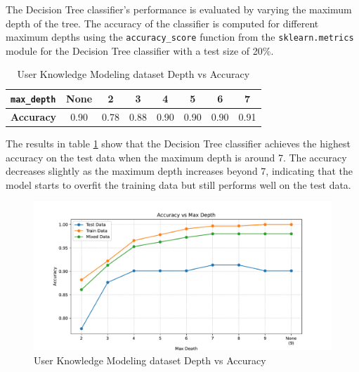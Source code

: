 The Decision Tree classifier's performance is evaluated by varying the maximum depth of the tree. The accuracy of the classifier is computed for different maximum depths using the \texttt{accuracy\_score} function from the \texttt{sklearn.metrics} module for the Decision Tree classifier with a test size of 20\%.


\begin{table}[H]
    \centering
    \begin{tabular}{|l|c|c|c|c|c|c|c|}
        \hline
        \textbf{\texttt{max\_depth}} & None & 2 & 3 & 4 & 5 & 6 & 7 \\ \hline
        \textbf{Accuracy} & 0.90 & 0.78 & 0.88 & 0.90 & 0.90 & 0.90 & 0.91 \\ \hline
    \end{tabular}
    \caption{User Knowledge Modeling dataset Depth vs Accuracy}
    \label{tab:user_knowledge_modeling_depth_vs_accuracy}
\end{table}

The results in table \ref{tab:user_knowledge_modeling_depth_vs_accuracy} show that the Decision Tree classifier achieves the highest accuracy on the test data when the maximum depth is around 7. The accuracy decreases slightly as the maximum depth increases beyond 7, indicating that the model starts to overfit the training data but still performs well on the test data.

\begin{figure}[H]
    \centering
    \includegraphics[width=\textwidth]{figures/user_knowledge_modeling_accuracy_vs_max_depth.pdf}
    \caption{User Knowledge Modeling dataset Depth vs Accuracy}
    \label{fig:user_knowledge_modeling_accuracy_vs_max_depth}
\end{figure}

